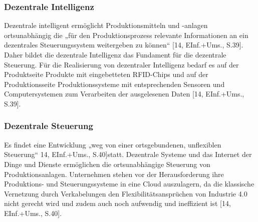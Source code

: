 \subsubsection{Dezentrale Intelligenz}\label{sec:DezentraleIntelligenz}
Dezentrale intelligent ermöglicht Produktionsmitteln und -anlagen ortsunabhängig die „für den Produktionsprozess relevante Informationen an ein dezentrales Steuerungssystem weitergeben zu können“ [14, EInf.+Ums., S.39]. Daher bildet die dezentrale Intelligenz das Fundament für die dezentrale Steuerung. 
\newline
Für die Realisierung von dezentraler Intelligenz bedarf es auf der Produktseite Produkte mit eingebetteten RFID-Chips und auf der Produktionsseite Produktionssysteme mit entsprechenden Sensoren und Computersystemen zum Verarbeiten der ausgelesenen Daten [14, EInf.+Ums., S.39].

\subsubsection{Dezentrale Steuerung}\label{sec:DezentraleSteuerung}
Es findet eine Entwicklung „weg von einer ortsgebundenen, unflexiblen Steuerung“ 14, EInf.+Ums., S.40]statt. Dezentrale Systeme und das Internet der Dinge und Dienste ermöglichen die ortsunabhängige Steuerung von Produktionsanlagen.
\newline
Unternehmen stehen vor der Herausforderung ihre Produktions- und Steuerungssysteme in eine Cloud auszulagern, da die klassische Vernetzung durch Verkabelungen den Flexibilitätsansprüchen von Industrie 4.0 nicht gerecht wird und zudem auch noch aufwendig und ineffizient ist [14, EInf.+Ums., S.40].

